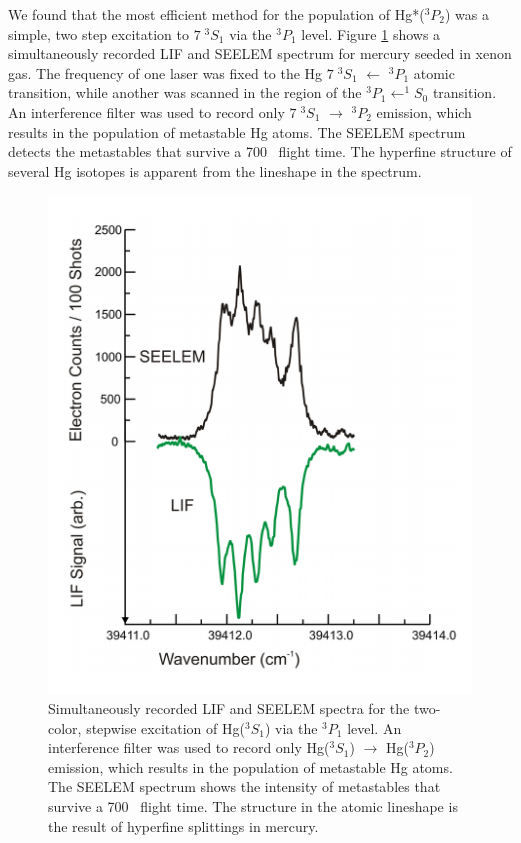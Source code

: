 We found that the most efficient method for the population of
Hg*($^3P_2$) was a simple, two step excitation to $7 \; ^3S_1$ via the
$^3P_1$ level.  
Figure \ref{fig:hg-twostep} shows a simultaneously recorded LIF and
SEELEM spectrum for mercury seeded in xenon gas.  The frequency of one
laser was fixed to the Hg $7 \; ^3S_1$ $\leftarrow$ $^3P_1$ atomic
transition, while another was scanned in the region of the $^3P_1
\leftarrow ^1S_0$ transition.  An interference filter was used to
record only $7 \; ^3S_1$ $\rightarrow$ $^3P_2$ emission, which results
in the population of metastable Hg atoms.  The SEELEM spectrum detects
the metastables that survive a 700 \microsec\ flight time.  The
hyperfine structure of several Hg isotopes is apparent from the
lineshape in the spectrum.

\begin{figure}
  \caption{Simultaneously recorded LIF and SEELEM spectra for the
    two-color, stepwise excitation of Hg($^3S_1$) via the $^3P_1$
    level.  An interference filter was used to record only Hg($^3S_1$)
    $\rightarrow$ Hg($^3P_2$) emission, which results in the
    population of metastable Hg atoms.  The SEELEM spectrum shows the
    intensity of metastables that survive a 700 \microsec\ flight
    time.  The structure in the atomic lineshape is the result of
    hyperfine splittings in mercury.}
  \label{fig:hg-twostep}
  \centering
  \includegraphics[width=6.5in]{hg-twostep.pdf}
\end{figure}

